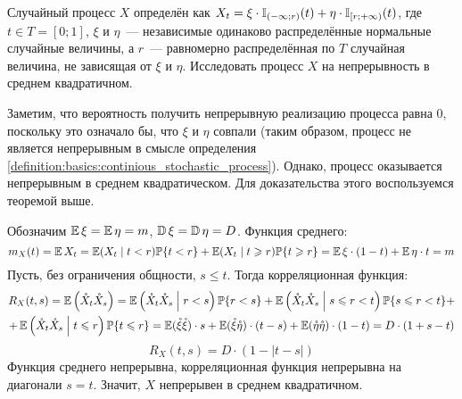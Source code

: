 \begin{exercise}
    \label{exercise:calculus:continuous_step_process}
    Случайный процесс $ X $ определён как $ X_t = \xi \cdot \mathbb{I}_{(-\infty;r)}(t) + \eta \cdot \mathbb{I}_{[r;+\infty)}(t) $,
    где $ t \in T = [0;1] $, $ \xi $ и $ \eta $~--- независимые одинаково распределённые нормальные случайные величины,
    а $ r $~--- равномерно распределённая по $ T $ случайная величина, не зависящая от $ \xi $ и $ \eta $.
    Исследовать процесс $ X $ на непрерывность в среднем квадратичном.
\end{exercise}

\begin{solution}
    Заметим, что вероятность получить непрерывную реализацию процесса равна $ 0 $,
    поскольку это означало бы, что $ \xi $ и $ \eta $ совпали
    (таким образом, процесс не является непрерывным в смысле определения \ref{definition:basics:continious_stochastic_process}).
    Однако, процесс оказывается непрерывным в среднем квадратическом.
    Для доказательства этого воспользуемся теоремой выше.

    Обозначим $ \operatorname{\mathbb{E}} \xi = \operatorname{\mathbb{E}} \eta = m $, $ \operatorname{\mathbb{D}} \xi = \operatorname{\mathbb{D}} \eta = D $.
    Функция среднего:
    \[
        m_X(t) = \operatorname{\mathbb{E}} X_t = \operatorname{\mathbb{E}} (X_t \mid t < r) \mathbb{P} \{t < r\} + \operatorname{\mathbb{E}} (X_t \mid t \geqslant r) \mathbb{P} \{t \geqslant r\} = \operatorname{\mathbb{E}} \xi \cdot (1 - t) + \operatorname{\mathbb{E}} \eta \cdot t = m
    \]
    Пусть, без ограничения общности, $ s \leqslant t $.
    Тогда корреляционная функция:
    \begin{multline*}
        R_X(t,s) = \operatorname{\mathbb{E}} \left( \mathring{X}_t \mathring{X}_s \right) =
        \operatorname{\mathbb{E}} \left( \mathring{X}_t \mathring{X}_s \;\middle|\; r < s \right) \mathbb{P} \{r < s\} +
        \operatorname{\mathbb{E}} \left( \mathring{X}_t \mathring{X}_s \;\middle|\; s \leqslant r < t \right) \mathbb{P} \{s \leqslant r < t\} + \\
        + \operatorname{\mathbb{E}} \left( \mathring{X}_t \mathring{X}_s \;\middle|\; t \leqslant r \right) \mathbb{P} \{t \leqslant r\} =
        \operatorname{\mathbb{E}} (\mathring{\xi} \mathring{\xi}) \cdot s +
        \operatorname{\mathbb{E}} (\mathring{\xi} \mathring{\eta}) \cdot (t - s) +
        \operatorname{\mathbb{E}} (\mathring{\eta} \mathring{\eta}) \cdot (1 - t) =
        D \cdot (1 + s - t)
    \end{multline*}
    \[
        R_X(t, s) = D \cdot (1 - |t - s|)
    \]
    Функция среднего непрерывна, корреляционная функция непрерывна на диагонали $ s = t $.
    Значит, $ X $ непрерывен в среднем квадратичном.
\end{solution}




